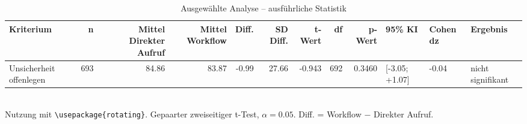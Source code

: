 \begin{table}
\centering
\caption{Ausgewählte Analyse -- ausführliche Statistik}
\begin{tabular}{lrrrrrrrrlll}
\toprule
Kriterium & n & Mittel Direkter Aufruf & Mittel Workflow & Diff. & SD Diff. & t-Wert & df & p-Wert & 95\% KI & Cohen dz & Ergebnis \\
\midrule
Unsicherheit offenlegen & 693 & 84.86 & 83.87 & -0.99 & 27.66 & -0.943 & 692 & 0.3460 & [-3.05; +1.07] & -0.04 & nicht signifikant \\
\bottomrule
\end{tabular}
\\[2mm]
\footnotesize Nutzung mit \texttt{\textbackslash usepackage\{rotating\}}. Gepaarter zweiseitiger t-Test, $\alpha=0.05$. Diff. = Workflow $-$ Direkter Aufruf.
\end{table}
